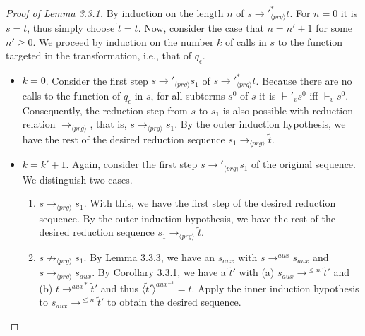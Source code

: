 \begin{proof}[Proof of Lemma 3.3.1]

By induction on the length $n$ of $s {\longrightarrow'}_{\langle prg \rangle}^* t$. For $n = 0$ it is $s = t$, thus simply choose $\widetilde{t} = t$. Now, consider the case that $n = n'+1$ for some $n' \geq 0$. We proceed by induction on the number $k$ of calls in $s$ to the function targeted in the transformation, i.e., that of $q_\epsilon$.

\begin{itemize}
\item $k = 0$. Consider the first step $s {\longrightarrow'}_{\langle prg \rangle} s_1$ of $s {\longrightarrow'}_{\langle prg \rangle}^* t$. Because there are no calls to the function of $q_\epsilon$ in $s$, for all subterms $s^0$ of $s$ it is $\vdash'_v s^0$ iff $\vdash_v s^0$. Consequently, the reduction step from $s$ to $s_1$ is also possible with reduction relation $\longrightarrow_{\langle prg \rangle}$, that is, $s \longrightarrow_{\langle prg \rangle} s_1$. By the outer induction hypothesis, we have the rest of the desired reduction sequence $s_1 \longrightarrow_{\langle prg \rangle} \widetilde{t}$.

\item $k = k' + 1$. Again, consider the first step $s {\longrightarrow'}_{\langle prg \rangle} s_1$ of the original sequence. We distinguish two cases.
\begin{enumerate}
\item $s \longrightarrow_{\langle prg \rangle} s_1$. With this, we have the first step of the desired reduction sequence. By the outer induction hypothesis, we have the rest of the desired reduction sequence $s_1 \longrightarrow_{\langle prg \rangle} \widetilde{t}$.

\item $s \not\longrightarrow_{\langle prg \rangle} s_1$. By Lemma 3.3.3, we have an $s_{aux}$ with $s \longrightarrow^{aux} s_{aux}$ and $s \longrightarrow_{\langle prg \rangle} s_{aux}$. By Corollary 3.3.1, we have a $\widetilde{t}'$ with (a) $s_{aux} \longrightarrow^{\leq n} \widetilde{t}'$ and (b) $t {\longrightarrow^{aux}}^* \widetilde{t}'$ and thus $\langle \widetilde{t}' \rangle^{aux^{-1}} = t$. Apply the inner induction hypothesis to $s_{aux} \longrightarrow^{\leq n} \widetilde{t}'$ to obtain the desired sequence.
\end{enumerate}
\end{itemize}

\end{proof}


